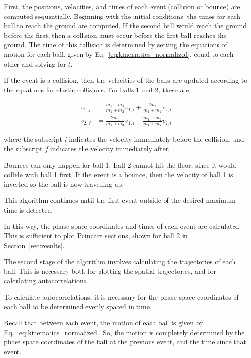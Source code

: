 \documentclass[pra,twocolumn,showpacs,amsmath,amssymb, aps, 10pt]{revtex4-1}
\begin{document}
First, the positions, velocities, and times of each event (collision or bounce) are
computed sequentially. Beginning with the initial conditions, the times for each
ball to reach the ground are computed. If the second ball would reach the ground
before the first, then a collision must occur before the first ball reaches the
ground. The time of this collision is determined by setting the equations of
motion for each ball, given by Eq.~\ref{eq:kinematics_normalized}, equal to each
other and solving for $t$.

If the event is a collision, then the velocities of the balls are updated according
to the equations for elastic collisions. For balls $1$ and $2$, these are

\begin{align}
  v_{1,f} &= \frac{m_1-m_2}{m_1+m_2}v_{1,i} + \frac{2 m_2}{m_1+m_2}v_{2,i} \\
  v_{2,f} &= \frac{2 m_1}{m_1+m_2}v_{1,i} - \frac{m_1-m_2}{m_1+m_2}v_{2,i}
\end{align}

where the subscript $i$ indicates the velocity immediately before the collision,
and the subscript $f$ indicates the velocity immediately after.

Bounces can only happen for ball 1. Ball 2 cannot hit the floor, since it would
collide with ball 1 first. If the event is a bounce, then the velocity of ball 1
is inverted so the ball is now travelling up. %

This algorithm continues until the first event outside of the desired maximum
time is detected.

In this way, the phase space coordinates and times of each event are calculated.
This is sufficient to plot Poincare sections, shown for ball 2 in
Section~\ref{sec:results}.


The second stage of the algorithm involves calculating the trajectories of each
ball. This is necessary both for plotting the spatial trajectories, and for
calculating autocorrelations.

To calculate autocorrelations, it is necessary %
for the phase space coordinates of each ball to be determined evenly spaced in time.

Recall that between each event, the motion of each ball is given by
Eq.~\ref{eq:kinematics_normalized}. So, the motion is completely determined by
the phase space coordinates of the ball at the previous event, and the time
since that event.
\end{document}

